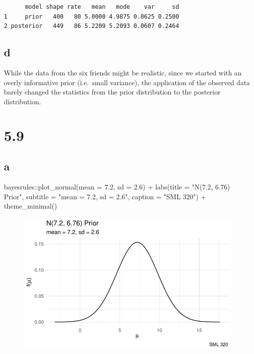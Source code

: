 \documentclass[
  letterpaper,
  DIV=11,
  numbers=noendperiod]{scrartcl}
\newenvironment{Shaded}{\begin{snugshade}}{\end{snugshade}}
\newcommand{\AttributeTok}[1]{\textcolor[rgb]{0.40,0.45,0.13}{#1}}
\newcommand{\FloatTok}[1]{\textcolor[rgb]{0.68,0.00,0.00}{#1}}
\newcommand{\FunctionTok}[1]{\textcolor[rgb]{0.28,0.35,0.67}{#1}}
\newcommand{\NormalTok}[1]{\textcolor[rgb]{0.00,0.23,0.31}{#1}}
\newcommand{\SpecialCharTok}[1]{\textcolor[rgb]{0.37,0.37,0.37}{#1}}
\newcommand{\StringTok}[1]{\textcolor[rgb]{0.13,0.47,0.30}{#1}}
\begin{document}
\begin{verbatim}
      model shape rate   mean   mode    var     sd
1     prior   400   80 5.0000 4.9875 0.0625 0.2500
2 posterior   449   86 5.2209 5.2093 0.0607 0.2464
\end{verbatim}

\hypertarget{d}{%
\subsection{d}\label{d}}

While the data from the six friends might be realistic, since we started
with an overly informative prior (i.e.~small variance), the application
of the observed data barely changed the statistics from the prior
distribution to the posterior distribution.

\hypertarget{section-2}{%
\section{5.9}\label{section-2}}

\hypertarget{a-2}{%
\subsection{a}\label{a-2}}

\begin{Shaded}
\begin{Highlighting}[]
\NormalTok{bayesrules}\SpecialCharTok{::}\FunctionTok{plot\_normal}\NormalTok{(}\AttributeTok{mean =} \FloatTok{7.2}\NormalTok{, }\AttributeTok{sd =} \FloatTok{2.6}\NormalTok{) }\SpecialCharTok{+}
  \FunctionTok{labs}\NormalTok{(}\AttributeTok{title =} \StringTok{"N(7.2, 6.76) Prior"}\NormalTok{,}
       \AttributeTok{subtitle =} \StringTok{"mean = 7.2, sd = 2.6"}\NormalTok{,}
       \AttributeTok{caption =} \StringTok{"SML 320"}\NormalTok{) }\SpecialCharTok{+}
  \FunctionTok{theme\_minimal}\NormalTok{()}
\end{Highlighting}
\end{Shaded}

\begin{figure}[H]

{\centering \includegraphics{ps4_code_files/figure-pdf/unnamed-chunk-4-1.pdf}

}

\end{figure}
\end{document}
